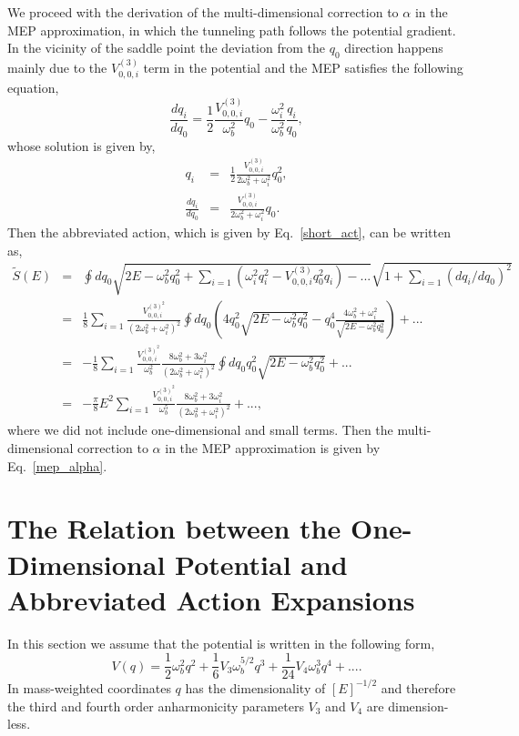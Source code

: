 \documentclass[journal=jpcafh,manuscript=article]{achemso}
\begin{document}
We proceed with the derivation of the multi-dimensional correction to
$\alpha$ in the MEP approximation, in which the tunneling path follows the
potential gradient. In the vicinity of the saddle point the deviation
from the $q_0$ direction happens mainly due to the $V^{(3)}_{0,0,i}$ term in the
potential and the MEP satisfies the following equation,
\begin{equation}
  \label{e10}
  \frac{dq_i}{dq_0}=\frac{1}{2}\frac{V^{(3)}_{0,0,i}}{\omega_b^2}q_0-\frac{\omega_i^2}{\omega_b^2}\frac{q_i}{q_0},
\end{equation}
whose solution is given by,
\begin{eqnarray}
  \label{e11a}
  q_i&=&\frac{1}{2}\frac{V^{(3)}_{0,0,i}}{2\omega_b^2+\omega_i^2}q_0^2,
  \\
  \label{e11b}
  \frac{dq_i}{dq_0}&=&\frac{V^{(3)}_{0,0,i}}{2\omega_b^2+\omega_i^2}q_0.
\end{eqnarray}
Then the abbreviated action, which is given by Eq.~\ref{short_act}, can be
written as,
\begin{eqnarray}
  \nonumber
  \tilde{S}(E)&=&\oint{d}q_0\sqrt{2E-\omega_b^2q_0^2+\sum_{i=1}(\omega_i^2q_i^2-V^{(3)}_{0,0,i}q_0^2q_i)-...}
                  \sqrt{1+\sum_{i=1}(dq_i/dq_0)^2}
  \\
  \nonumber
              &=&\frac{1}{8}\sum_{i=1}\frac{V^{(3)^2}_{0,0,i}}{(2\omega_b^2+\omega_i^2)^2}
                       \oint{d}q_0\left(4q_0^2\sqrt{2E-\omega_b^2q_0^2}-q_0^4\frac{4\omega_b^2+\omega_i^2}{\sqrt{2E-\omega_b^2q_0^2}}\right)+...
  \\
  \nonumber
              &=&-\frac{1}{8}\sum_{i=1}\frac{V^{(3)^2}_{0,0,i}}{\omega_b^2}\frac{8\omega_b^2+3\omega_i^2}{(2\omega_b^2+\omega_i^2)^2}
                  \oint{d}q_0q_0^2\sqrt{2E-\omega_b^2q_0^2}+...
  \\
  \label{e12}
              &=&-\frac{\pi}{8}E^2\sum_{i=1}\frac{V^{(3)^2}_{0,0,i}}{\omega_b^5}\frac{8\omega_b^2+3\omega_i^2}{(2\omega_b^2+\omega_i^2)^2}+...,
\end{eqnarray}
where we did not include one-dimensional and small terms. Then the
multi-dimensional correction to $\alpha$ in the MEP approximation is given
by Eq.~\ref{mep_alpha}.

\setcounter{equation}{0}
\section{The Relation between the One-Dimensional Potential and
  Abbreviated Action Expansions}
In this section we assume that the potential is written in the
following form,
\begin{equation}
  \label{one_pot_exp}
  V(q)=\frac{1}{2}\omega_b^2q^2+\frac{1}{6}V_3\omega_b^{5/2}q^3
  +\frac{1}{24}V_4\omega_b^3q^4+... .
\end{equation}
In mass-weighted coordinates $q$ has the dimensionality of
$[E]^{-1/2}$ and therefore the third and fourth order anharmonicity
parameters $V_3$ and $V_4$ are dimension-less.
\end{document}
